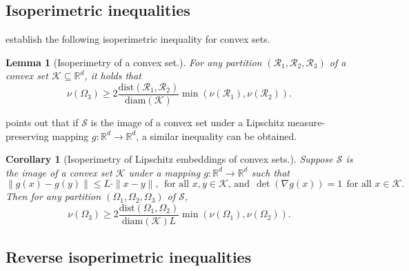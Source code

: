 \documentclass{article}
\newcommand{\Reals}{\mathbb{R}}
\newcommand{\diam}{\mathrm{diam}}
\newcommand{\1}{\mathbf{1}}
\newcommand{\Rd}{\Reals^d}
\newcommand{\mc}[1]{\mathcal{#1}}
\newtheorem{lemma}{Lemma}[section]
\newtheorem{corollary}{Corollary}[section]
\theoremstyle{definition}
\theoremstyle{remark}
\begin{document}
\subsection{Isoperimetric inequalities}
\label{subsec:isoperimetric_inequalities}
\citet{dyer1991} establish the following isoperimetric inequality for convex sets.
\begin{lemma}[Isoperimetry of a convex set.]
	\label{lem:convex_isoperimetric_inequality}
	For any partition $(\mc{R}_1,\mc{R}_2,\mc{R}_3)$ of a convex set $\mc{K} \subseteq \Rd$, it holds that
	\begin{equation*}
	\nu(\Omega_3) \geq 2\frac{\mathrm{dist}(\mc{R}_1, \mc{R}_2)}{\mathrm{diam}(\mc{K})} \min(\nu(\mc{R}_1), \nu(\mc{R}_2)).
	\end{equation*}
\end{lemma}
\citet{abbasi-yadkori2016a} points out that if $\mc{S}$ is the image of a convex set under a Lipschitz measure-preserving mapping $g: \Rd \to \Rd$, a similar inequality can be obtained.
\begin{corollary}[Isoperimetry of Lipschitz embeddings of convex sets.]
	\label{cor:nonconvex_isoperimetric_inequality}
	Suppose $\mc{S}$ is the image of a convex set $\mathcal{K}$ under a mapping $g:\Rd \to \Rd$ such that
	\begin{equation*}
	\|g(x) - g(y)\| \leq L \cdot \|x - y\|,~~\textrm{for all $x,y \in \mc{K}$, and}~~\det(\nabla g(x)) = 1~~\textrm{for all $x \in \mc{K}$.}
	\end{equation*}
	Then for any partition $(\Omega_1,\Omega_2,\Omega_3)$ of $\mc{S}$, 
	\begin{equation*}
	\nu(\Omega_3) \geq 2\frac{\mathrm{dist}(\Omega_1, \Omega_2)}{\diam(\mc{K}) L} \min(\nu(\Omega_1), \nu(\Omega_2)).
	\end{equation*}
\end{corollary}

\subsection{Reverse isoperimetric inequalities}
\label{subsec:reverse_isoperimetric_inequalities}
\end{document}
